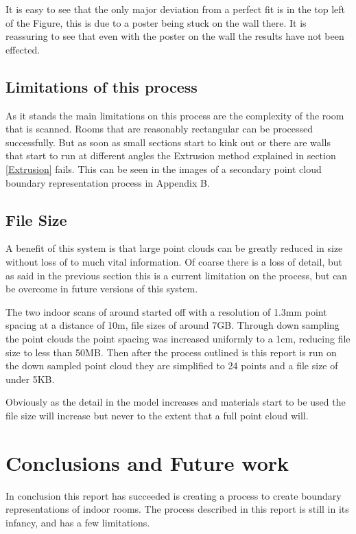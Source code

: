 		It is easy to see that the only major deviation from a perfect fit is in the top left of the Figure, this is due to a poster being stuck on the wall there. It is reassuring to see that even with the poster on the wall the results have not been effected.
	
	\section{Limitations of this process}
	\label{Limitations}
		As it stands the main limitations on this process are the complexity of the room that is scanned. Rooms that are reasonably rectangular can be processed successfully. But as soon as small sections start to kink out or there are walls that start to run at different angles the Extrusion method explained in section \ref{Extrusion} fails. This can be seen in the images of a secondary point cloud boundary representation process in Appendix B.
		
	\section{File Size}
	
		A benefit of this system is that large point clouds can be greatly reduced in size without loss of to much vital information. Of coarse there is a loss of detail, but as said in the previous section this is a current limitation on the process, but can be overcome in future versions of this system.
		
		The two indoor scans of around started off with a resolution of 1.3mm point spacing at a distance of 10m, file sizes of around 7GB. Through down sampling the point clouds the point spacing was increased uniformly to a 1cm, reducing file size to less than 50MB. Then after the process outlined is this report is run on the down sampled point cloud they are simplified to 24 points and a file size of under 5KB.
		
		Obviously as the detail in the model increases and materials start to be used the file size will increase but never to the extent that a full point cloud will. 
		

	
\chapter{Conclusions and Future work}

In conclusion this report has succeeded is creating a process to create boundary representations of indoor rooms. The process described in this report is still in its infancy, and has a few limitations.


